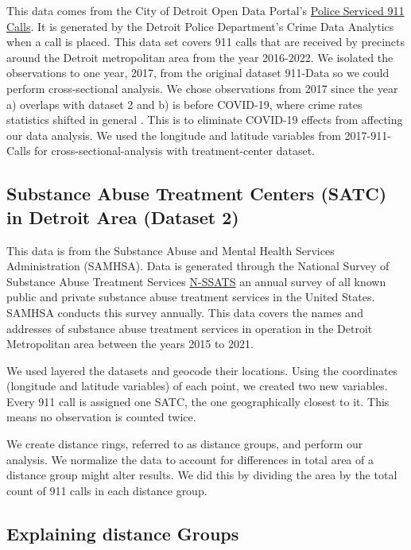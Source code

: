 \documentclass[12pt]{article}
\begin{document}
This data comes from the City of Detroit Open Data Portal's   \href{https://data.detroitmi.gov/datasets/detroitmi::police-serviced-911-calls/about}{Police Serviced 911 Calls}. It is generated by the Detroit Police Department's Crime Data Analytics when a call is placed. This data set covers 911 calls that are received by precincts around the Detroit metropolitan area from the year 2016-2022. We isolated the observations to one year, 2017, from the original dataset 911-Data so we could perform cross-sectional analysis. We chose observations from 2017 since the year a) overlaps with dataset 2 and b) is before COVID-19, where crime rates statistics shifted in general \cite{covid_and_crime}. This is to eliminate COVID-19 effects from affecting our data analysis. We used the longitude and latitude variables from 2017-911-Calls for cross-sectional-analysis with treatment-center dataset.

\subsection{Substance Abuse Treatment Centers (SATC) in Detroit Area (Dataset 2)}

This data is from the Substance Abuse and Mental Health Services Administration (SAMHSA). Data is generated through the National Survey of Substance Abuse Treatment Services \href{https://www.samhsa.gov/data/data-we-collect/n-ssats-national-survey-substance-abuse-treatment-services}{N-SSATS} an annual survey of all known public and private substance abuse treatment services in the United States. SAMHSA conducts this survey annually. This data covers the names and addresses of substance abuse treatment services in operation in the Detroit Metropolitan area between the years 2015 to 2021. 


We used layered the datasets and geocode their locations. Using the coordinates (longitude and latitude variables) of each point, we created two new variables. Every 911 call is assigned one SATC, the one geographically closest to it. This means no observation is counted twice. 

We create distance rings, referred to as distance groups, and perform our analysis. We normalize the data to account for differences in total area of a distance group might alter results. We did this by dividing the area by the total count of 911 calls in each distance group. 

\subsection{Explaining distance Groups}
\end{document}
